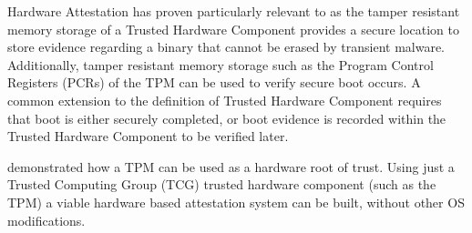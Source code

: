 \documentclass[acmsmall]{acmart}
\theoremstyle{definition}
\begin{document}
Hardware Attestation has proven particularly relevant to  as the
tamper resistant memory storage of a Trusted Hardware Component provides a secure location to store
evidence regarding a binary that cannot be erased by transient malware.
Additionally, tamper resistant memory storage such as the Program Control Registers (PCRs) of the
TPM can be used to verify secure boot occurs.
A common extension to the definition of Trusted Hardware Component requires that boot is either
securely completed, or boot evidence is recorded within the Trusted Hardware Component to be
verified later.

\citet{Kuhn:07:Realizing-prope} demonstrated how a TPM can be used as a hardware root of trust.
Using just a Trusted Computing Group (TCG) trusted hardware component (such as the TPM)
a viable hardware based attestation system can be built, without other OS modifications.
\end{document}
